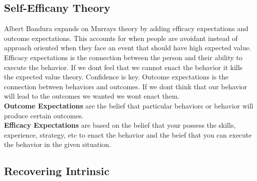 \documentclass[12pt]{article}
\begin{document}
\subsection*{Self-Efficany Theory}
Albert Bandura expands on Murrays theory by adding efficacy expectations and outcome expectations. This accounts for when people are avoidant instead of approach oriented when they face an event that should have high expected value. Efficacy expectations is the connection between the person and their ability to execute the behavior. If we dont feel that we cannot enact the behavior it kills the expected value theory. Confidence is key. Outcome expectations is the connection between behaviors and outcomes. If we dont think that our behavior will lead to the outcomes we wanted we wont enact them. \\
\textbf{Outcome Expectations} are the belief that particular behaviors or behavior will produce certain outcomes.\\
\textbf{Efficacy Expectations} are based on the belief that your possess the skills, experience, strategy, etc to enact the behavior and the beief that you can execute the behavior in the given situation.\\
\subsection*{Recovering Intrinsic}
\end{document}
